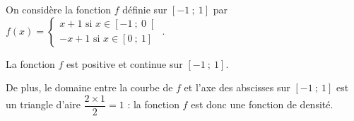 \documentclass{cornouaille}
\begin{document}
\begin{exemple}

\begin{minipage}{0.5\linewidth}
On considère la fonction $f$ définie sur $\left[-1\ ;\ 1 \right]$ par $f(x)=\left\{\begin{array}{l}
x+1 \textrm{ si } x\in\left[-1\ ;\ 0 \right[ \\
-x+1 \textrm{ si } x\in\left[0\ ;\ 1 \right]
\end{array}\right.$.
\end{minipage}
\hfill
\begin{minipage}{0.5\linewidth}
\begin{center}
\end{center}
\end{minipage}

La fonction $f$ est positive et continue sur $\left[-1\ ;\ 1 \right]$.

De plus, le domaine entre la courbe de $f$ et l'axe des abscisses sur $\left[-1\ ;\ 1 \right]$ est un triangle d'aire $\dfrac{2\times1}{2}=1$ : la fonction $f$ est donc une fonction de densité.
\end{exemple}
\end{document}

